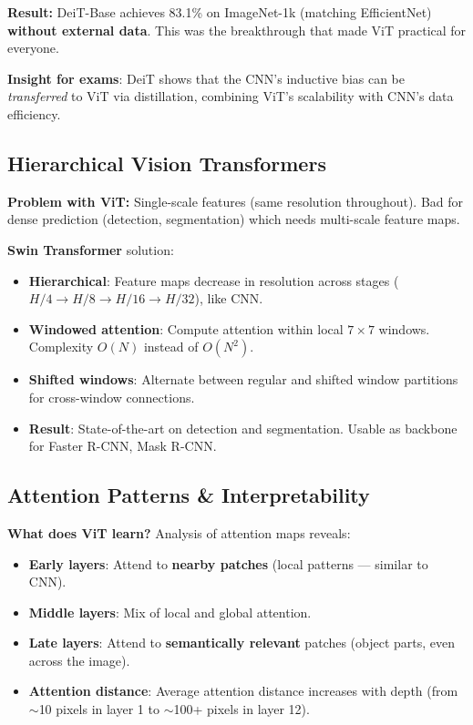 \textbf{Result:} DeiT-Base achieves 83.1\% on ImageNet-1k (matching EfficientNet) \textbf{without external data}. This was the breakthrough that made ViT practical for everyone.

\textbf{Insight for exams}: DeiT shows that the CNN's inductive bias can be \emph{transferred} to ViT via distillation, combining ViT's scalability with CNN's data efficiency.

\subsection{Hierarchical Vision Transformers}

\textbf{Problem with ViT:} Single-scale features (same resolution throughout). Bad for dense prediction (detection, segmentation) which needs multi-scale feature maps.

\textbf{Swin Transformer} solution:
\begin{itemize}
\item \textbf{Hierarchical}: Feature maps decrease in resolution across stages ($H/4 \to H/8 \to H/16 \to H/32$), like CNN.
\item \textbf{Windowed attention}: Compute attention within local $7 \times 7$ windows. Complexity $O(N)$ instead of $O(N^2)$.
\item \textbf{Shifted windows}: Alternate between regular and shifted window partitions for cross-window connections.
\item \textbf{Result}: State-of-the-art on detection and segmentation. Usable as backbone for Faster R-CNN, Mask R-CNN.
\end{itemize}

\subsection{Attention Patterns \& Interpretability}

\textbf{What does ViT learn?} Analysis of attention maps reveals:
\begin{itemize}
\item \textbf{Early layers}: Attend to \textbf{nearby patches} (local patterns — similar to CNN).
\item \textbf{Middle layers}: Mix of local and global attention.
\item \textbf{Late layers}: Attend to \textbf{semantically relevant} patches (object parts, even across the image).
\item \textbf{Attention distance}: Average attention distance increases with depth (from $\sim$10 pixels in layer 1 to $\sim$100+ pixels in layer 12).
\end{itemize}

